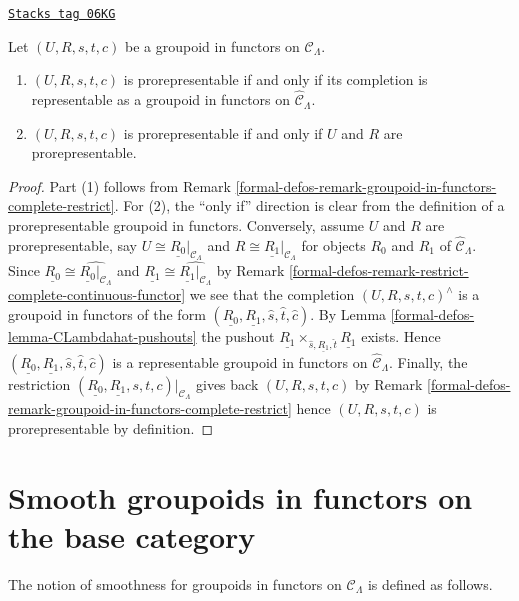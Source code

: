 \begin{lemma}
\label{formal-defos-lemma-groupoid-in-functors-prorep-equivalences}
\href{https://stacks.math.columbia.edu/tag/06KG}{\texttt{Stacks tag 06KG}}

Let $(U, R, s, t, c)$ be a groupoid in functors on $\mathcal{C}_\Lambda$.
\begin{enumerate}
\item $(U, R, s, t, c)$ is prorepresentable if and only if its completion is
representable as a groupoid in functors on $\widehat{\mathcal{C}}_\Lambda$.
\item $(U, R, s, t, c)$ is prorepresentable if and only if $U$ and $R$ are
prorepresentable.
\end{enumerate}
\end{lemma}

\begin{proof}
Part (1) follows from
Remark \ref{formal-defos-remark-groupoid-in-functors-complete-restrict}.
For (2), the ``only if'' direction is clear from the definition
of a prorepresentable groupoid in functors. Conversely, assume $U$ and $R$
are prorepresentable, say $U \cong \underline{R_0}|_{\mathcal{C}_\Lambda}$
and $R \cong \underline{R_1}|_{\mathcal{C}_\Lambda}$ for objects $R_0$ and
$R_1$ of $\widehat{\mathcal{C}}_\Lambda$.
Since $\underline{R_0} \cong \widehat{\underline{R_0}|_{\mathcal{C}_\Lambda}}$
and $\underline{R_1} \cong \widehat{\underline{R_1}|_{\mathcal{C}_\Lambda}}$
by
Remark \ref{formal-defos-remark-restrict-complete-continuous-functor}
we see that the completion $(U, R, s, t, c)^\wedge$ is a groupoid in
functors of the form
$(\underline{R_0}, \underline{R_1}, \widehat{s}, \widehat{t}, \widehat{c})$.
By
Lemma \ref{formal-defos-lemma-CLambdahat-pushouts}
the pushout
$\underline{R_1} \times_{\widehat{s}, \underline{R_1}, \widehat{t}}
\underline{R_1}$ exists. Hence
$(\underline{R_0}, \underline{R_1}, \widehat{s}, \widehat{t}, \widehat{c})$
is a representable groupoid in functors on $\widehat{\mathcal{C}}_\Lambda$.
Finally, the restriction
$(\underline{R_0}, \underline{R_1}, s, t, c)|_{\mathcal{C}_\Lambda}$
gives back $(U, R, s, t, c)$ by
Remark \ref{formal-defos-remark-groupoid-in-functors-complete-restrict}
hence $(U, R, s, t, c)$ is prorepresentable by definition.
\end{proof}

\section{Smooth groupoids in functors on the base category}
\label{formal-defos-section-smooth-minimal-groupoids-in-functors}
The notion of smoothness for groupoids in functors on $\mathcal{C}_\Lambda$ is
defined as follows.

